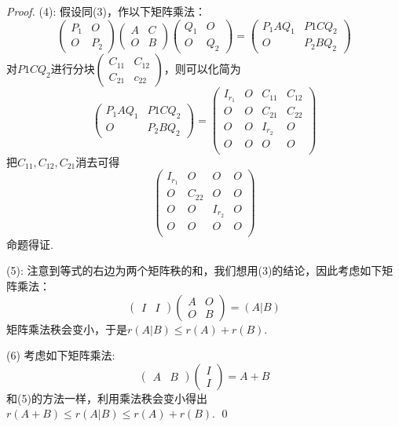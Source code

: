 \begin{proof}
	(4): 假设同(3)，作以下矩阵乘法：
	$$
		\begin{pmatrix}
			P_1 & O \\
			O & P_2
		\end{pmatrix} 
		\begin{pmatrix}
			A & C \\
			O & B
		\end{pmatrix} 
		\begin{pmatrix}
			Q_1 & O \\
			O & Q_2
		\end{pmatrix} = 
		\begin{pmatrix}
			P_1AQ_1 & P1CQ_2 \\
			O & P_2BQ_2 
		\end{pmatrix}
	$$
	对$P1CQ_2$进行分块$\begin{pmatrix}
		C_{11} & C_{12} \\
		C_{21} & c_{22}
	\end{pmatrix}$，则可以化简为
	$$
		\begin{pmatrix}
			P_1AQ_1 & P1CQ_2 \\
			O & P_2BQ_2 
		\end{pmatrix}=
		\begin{pmatrix}
			I_{r_1} & O & C_{11} & C_{12} \\
			O & O & C_{21} & C_{22} \\
			O & O & I_{r_2} & O \\
			O & O & O & O \\
		\end{pmatrix}
	$$
	把$C_{11},C_{12},C_{21}$消去可得
	$$
	\begin{pmatrix}
		I_{r_1} & O & O & O \\
		O & C_{22} & O & O  \\
		O & O & I_{r_2} & O \\
		O & O & O & O \\
	\end{pmatrix}
	$$
	命题得证.

	(5): 注意到等式的右边为两个矩阵秩的和，我们想用(3)的结论，因此考虑如下矩阵乘法：
	$$
		\begin{pmatrix}
			I & I 
		\end{pmatrix}
		\begin{pmatrix}
			A & O \\
			O & B
		\end{pmatrix} = (A \vert B)
	$$
	矩阵乘法秩会变小，于是$r(A \vert B) \leq r(A) + r(B)$.

	(6) 考虑如下矩阵乘法:
	$$
		\begin{pmatrix}
			A & B
		\end{pmatrix}
		\begin{pmatrix}
			I \\
			I
		\end{pmatrix} = A + B
	$$
	和(5)的方法一样，利用乘法秩会变小得出$r(A+B) \leq r(A \vert B) \leq r(A) + r(B)$. 
	\qed
\end{proof}

